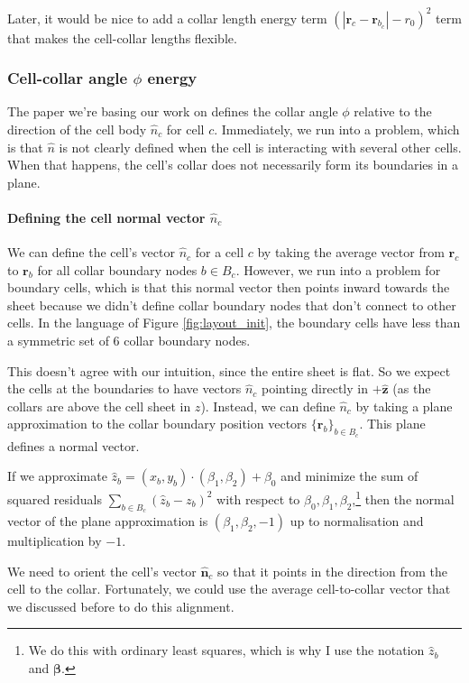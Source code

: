 Later, it would be nice to add a collar length energy term $(|\bm{r}_c - \bm{r}_{b_{c}}| - r_0)^2$ term that makes the cell-collar lengths flexible.

\subsubsection{Cell-collar angle $\phi$ energy}

The paper we're basing our work on defines the collar angle $\phi$ relative to the direction of the cell body $\hat{n}_c$ for cell $c$. Immediately, we run into a problem, which is that $\hat{n}$ is not clearly defined when the cell is interacting with several other cells. When that happens, the cell's collar does not necessarily form its boundaries in a plane. 

\paragraph{Defining the cell normal vector $\hat{n}_c$}
We can define the cell's vector $\hat{n}_c$ for a cell $c$ by taking the average vector from $\bm{r}_c$ to $\bm{r}_b$ for all collar boundary nodes $b \in B_c$. However, we run into a problem for boundary cells, which is that this normal vector then points inward towards the sheet because we didn't define collar boundary nodes that don't connect to other cells. In the language of Figure \ref{fig:layout_init}, the boundary cells have less than a symmetric set of 6 collar boundary nodes. 

This doesn't agree with our intuition, since the entire sheet is flat. So we expect the cells at the boundaries to have vectors $\hat{n}_c$ pointing directly in $+\hat{\bm{z}}$ (as the collars are above the cell sheet in $z$). Instead, we can define $\hat{n}_c$ by taking a plane approximation to the collar boundary position vectors $\{ \bm{r}_b \}_{b \in B_c}$. This plane defines a normal vector.

If we approximate $\hat{z}_b = (x_b, y_b)\cdot (\beta_1, \beta_2) + \beta_0$ and minimize the sum of squared residuals $\sum_{b\in B_c} (\hat{z}_b - z_b)^2$ with respect to $\beta_0, \beta_1, \beta_2$,\footnote{We do this with ordinary least squares, which is why I use the notation $\hat{z}_b$ and $\bm{\beta}$.} then the normal vector of the plane approximation is $(\beta_1, \beta_2, -1)$ up to normalisation and multiplication by $-1$. 

We need to orient the cell's vector $\hat{\bm{n}}_c$ so that it points in the direction from the cell to the collar. Fortunately, we could use the average cell-to-collar vector that we discussed before to do this alignment. 

